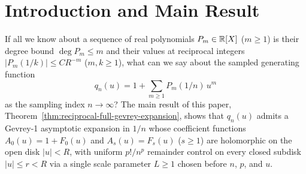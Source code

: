 \section{Introduction and Main Result}

If all we know about a sequence of real polynomials $P_m \in \mathbb{R}[X]$ ($m \ge 1$) is their degree bound $\deg P_m \le m$ and their values at reciprocal integers $|P_m(1/k)| \le C R^{-m}$ ($m, k \ge 1$), what can we say about the sampled generating function
\[
  q_n(u) = 1 + \sum_{m \ge 1} P_m(1/n)\, u^m
\]
as the sampling index $n \to \infty$? The main result of this paper, Theorem~\ref{thm:reciprocal-full-gevrey-expansion}, shows that $q_n(u)$ admits a Gevrey-1 asymptotic expansion in $1/n$ whose coefficient functions $A_0(u) = 1 + F_0(u)$ and $A_s(u) = F_s(u)$ ($s \ge 1$) are holomorphic on the open disk $|u| < R$, with uniform $p! / n^p$ remainder control on every closed subdisk $|u| \le r < R$ via a single scale parameter $L \ge 1$ chosen before $n$, $p$, and $u$.

